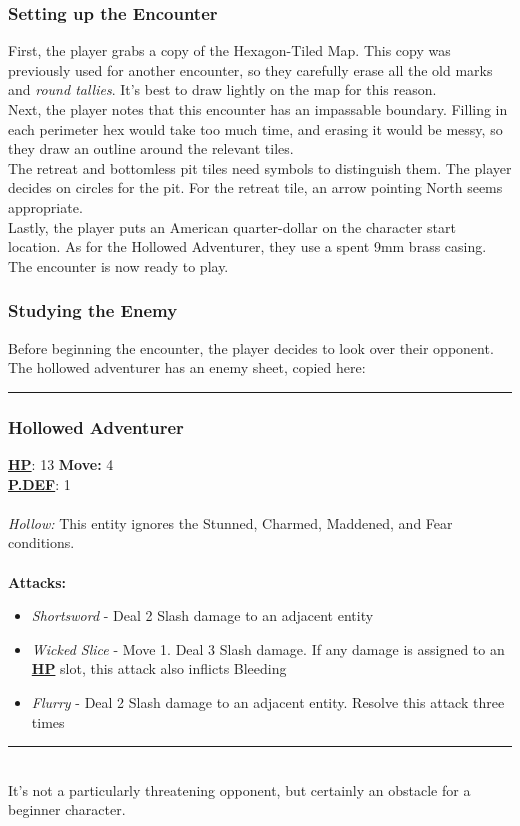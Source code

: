 \documentclass[12pt]{article}
\newcommand{\refto}[1]{\hyperlink{#1}{\textbf{#1}}}
\begin{document}
\begin{multicols*}{2}
\subsubsection*{Setting up the Encounter}
First, the player grabs a copy of the Hexagon-Tiled Map. This copy was previously used for another encounter, so they carefully erase all the old marks and \emph{round tallies}. It’s best to draw lightly on the map for this reason.\\
Next, the player notes that this encounter has an impassable boundary. Filling in each perimeter hex would take too much time, and erasing it would be messy, so they draw an outline around the relevant tiles.\\
The retreat and bottomless pit tiles need symbols to distinguish them. The player decides on circles for the pit. For the retreat tile, an arrow pointing North seems appropriate.\\
Lastly, the player puts an American quarter-dollar on the character start location. As for the Hollowed Adventurer, they use a spent 9mm brass casing.\\
The encounter is now ready to play.

\subsubsection*{Studying the Enemy}
Before beginning the encounter, the player decides to look over their opponent. The hollowed adventurer has an enemy sheet, copied here:\\

\hrule
\subsubsection*{Hollowed Adventurer}
\refto{HP}: 13 \hspace*{2cm} \textbf{Move:} 4 \\
\refto{P.DEF}: 1 \\\\
\emph{Hollow:} This entity ignores the Stunned, Charmed, Maddened, and Fear conditions.\\\\
\textbf{Attacks:}
\begin{itemize}
\item \emph{Shortsword} - Deal 2 Slash damage to an adjacent entity
\item \emph{Wicked Slice} - Move 1. Deal 3 Slash damage. If any damage is assigned to an \refto{HP} slot, this attack also inflicts Bleeding
\item \emph{Flurry} - Deal 2 Slash damage to an adjacent entity. Resolve this attack three times
\end{itemize}
\hrule
\ \\ 
It’s not a particularly threatening opponent, but certainly an obstacle for a beginner character.\\


\end{multicols*}
\end{document}
